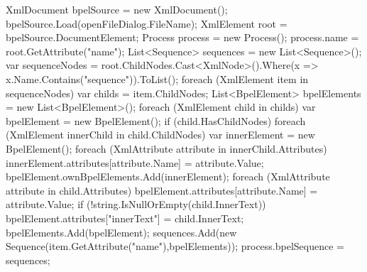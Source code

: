 \begin{landscape}
\begin{cpp}
  XmlDocument bpelSource = new XmlDocument();
            bpelSource.Load(openFileDialog.FileName);
            XmlElement root = bpelSource.DocumentElement;
            Process process = new Process();
            process.name = root.GetAttribute("name"); 
            List<Sequence> sequences = new List<Sequence>();
            var sequenceNodes = root.ChildNodes.Cast<XmlNode>().Where(x => x.Name.Contains("sequence")).ToList();
            foreach (XmlElement item in sequenceNodes)
            {
                var childs = item.ChildNodes;
                List<BpelElement> bpelElements = new List<BpelElement>();
                foreach (XmlElement child in childs)
                {
                    var bpelElement = new BpelElement();
                    if (child.HasChildNodes)
                    {
                        foreach (XmlElement innerChild in child.ChildNodes)
                        {
                            var innerElement = new BpelElement();
                            foreach (XmlAttribute attribute in innerChild.Attributes)
                            {
                                innerElement.attributes[attribute.Name] = attribute.Value;
                            }
                            bpelElement.ownBpelElements.Add(innerElement);
                        }
                    }
                    foreach (XmlAttribute attribute in child.Attributes)
                    {
                        bpelElement.attributes[attribute.Name] = attribute.Value;
                    }
                    if (!string.IsNullOrEmpty(child.InnerText))
                    {
                        bpelElement.attributes["innerText"] = child.InnerText;
                    }
                    bpelElements.Add(bpelElement);
                }
                sequences.Add(new Sequence(item.GetAttribute("name"),bpelElements));
            }
            process.bpelSequence = sequences;
\end{cpp}
\end{landscape}
